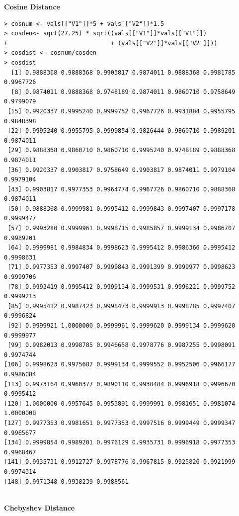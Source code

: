 \documentclass[fontsize=10pt]{scrartcl}
\begin{document}
\begin{enumerate}
\begin{enumerate}
			\textbf{\large Cosine Distance} \\
\begin{verbatim}
> cosnum <- vals[["V1"]]*5 + vals[["V2"]]*1.5
> cosden<- sqrt(27.25) * sqrt((vals[["V1"]]*vals[["V1"]]) 
+                             + (vals[["V2"]]*vals[["V2"]]))
> cosdist <- cosnum/cosden
> cosdist
  [1] 0.9888368 0.9888368 0.9903817 0.9874011 0.9888368 0.9981785 0.9967726
  [8] 0.9874011 0.9888368 0.9748189 0.9874011 0.9860710 0.9758649 0.9799079
 [15] 0.9920337 0.9995240 0.9999752 0.9967726 0.9931884 0.9955795 0.9848398
 [22] 0.9995240 0.9955795 0.9999854 0.9826444 0.9860710 0.9989201 0.9874011
 [29] 0.9888368 0.9860710 0.9860710 0.9995240 0.9748189 0.9888368 0.9874011
 [36] 0.9920337 0.9903817 0.9758649 0.9903817 0.9874011 0.9979104 0.9979104
 [43] 0.9903817 0.9977353 0.9964774 0.9967726 0.9860710 0.9888368 0.9874011
 [50] 0.9888368 0.9999981 0.9995412 0.9999843 0.9997407 0.9997178 0.9999477
 [57] 0.9993280 0.9999961 0.9998715 0.9985857 0.9999134 0.9986707 0.9989201
 [64] 0.9999981 0.9984834 0.9998623 0.9995412 0.9986366 0.9995412 0.9998631
 [71] 0.9977353 0.9997407 0.9999843 0.9991399 0.9999977 0.9998623 0.9999706
 [78] 0.9993419 0.9995412 0.9999134 0.9999531 0.9996221 0.9999752 0.9999213
 [85] 0.9995412 0.9987423 0.9998473 0.9999913 0.9998785 0.9997407 0.9996824
 [92] 0.9999921 1.0000000 0.9999961 0.9999620 0.9999134 0.9999620 0.9999977
 [99] 0.9982013 0.9998785 0.9946658 0.9978776 0.9987255 0.9998091 0.9974744
[106] 0.9998623 0.9975687 0.9999134 0.9999552 0.9952506 0.9966177 0.9986084
[113] 0.9973164 0.9960377 0.9890110 0.9930484 0.9996918 0.9996670 0.9995412
[120] 1.0000000 0.9957645 0.9953891 0.9999991 0.9981651 0.9981074 1.0000000
[127] 0.9977353 0.9981651 0.9977353 0.9997516 0.9999449 0.9999347 0.9965677
[134] 0.9999854 0.9989201 0.9976129 0.9935731 0.9996918 0.9977353 0.9968467
[141] 0.9935731 0.9912727 0.9978776 0.9967815 0.9925826 0.9921999 0.9974314
[148] 0.9971348 0.9938239 0.9988561


\end{verbatim}
			
			\textbf{\large Chebyshev Distance} \\


\end{enumerate}
\end{enumerate}
\end{document}
